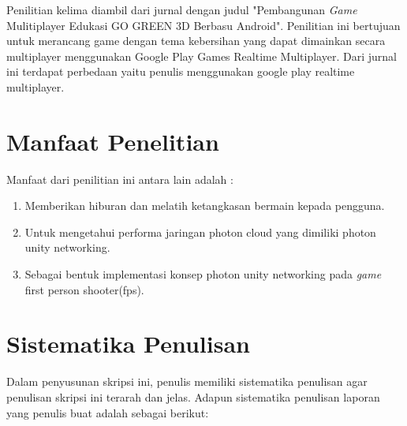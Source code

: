 Penilitian kelima diambil dari jurnal dengan judul "Pembangunan \textit{Game} Mulitiplayer Edukasi GO GREEN 3D
Berbasu Android". Penilitian ini bertujuan untuk merancang game dengan tema kebersihan yang dapat dimainkan secara multiplayer menggunakan Google Play Games Realtime Multiplayer. Dari jurnal ini terdapat perbedaan yaitu penulis menggunakan google play realtime multiplayer\cite{gogreen}.

\section{Manfaat Penelitian}
Manfaat dari penilitian ini antara lain adalah : 
\begin{enumerate}
	\item Memberikan hiburan dan melatih ketangkasan bermain 
	kepada pengguna.
	\item Untuk mengetahui performa jaringan photon cloud yang dimiliki photon unity networking.
	\item Sebagai bentuk implementasi konsep photon unity networking pada \textit{\textit{game}} first person shooter(fps).
\end{enumerate}

\section{Sistematika Penulisan}
\noindent

Dalam penyusunan skripsi ini, penulis memiliki sistematika penulisan agar 
penulisan skripsi ini terarah dan jelas. Adapun sistematika penulisan laporan yang 
penulis buat adalah sebagai berikut:

